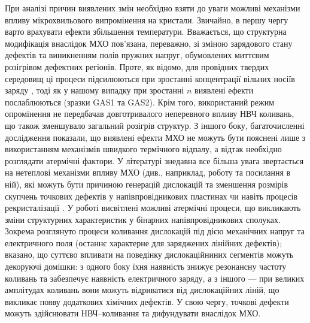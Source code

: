 При аналізі причин виявлених змін необхідно взяти до уваги можливі механізми впливу
мікрохвильового випромінення на кристали. 
Звичайно, в першу чергу варто врахувати ефекти збільшення температури.
Вважається, що  структурна модифікація внаслідок МХО пов'язана, переважно,
зі зміною зарядового стану дефектів та виникненням полів пружних напруг, обумовлених миттєвим розігрівом дефектних регіонів.
Проте, як відомо, для провідних твердих середовищ ці процеси підсилюються при зростанні концентрації вільних носіїв заряду \cite{MW:Rev}, тоді як у нашому випадку при зростанні $n$ виявлені ефекти послаблюються (зразки GAS1 та GAS2).
Крім того, використаний режим опромінення не передбачав довготривалого неперевного впливу НВЧ коливань, що також зменшувало загальний розігрів структур.
З іншого боку, багаточисленні дослідження показали, що виявлені ефекти МХО не можуть бути пояснені лише з використанням механізмів швидкого термічного відпалу, а відтак необхідно розглядати атермічні фактори.
У літературі знедавна все більша увага звертається на нетеплові механізми впливу МХО (див., наприклад, роботу \cite{MW:Si2018} та посилання в ній), які можуть бути причиною генерацій дислокацій та зменшення розмірів скупчень точкових дефектів у напівпровідникових пластинах \cite{Konakova2007JTF} чи навіть процесів рекристалізації \cite{MW:Si2018}.
У роботі \cite{Konakova2007JTF} висвітлені можливі атермічні процеси, що викликають зміни структурних характеристик у бінарних напівпровідникових сполуках.
Зокрема розглянуто процеси коливання дислокацій під дією механічних напруг та електричного поля (останнє характерне для заряджених лінійних дефектів);
вказано, що суттєво впливати на поведінку дислокаційниних сегментів можуть декоруючі домішки:
з одного боку їхня наявність знижує резонансну частоту коливань та забезпечує наявність електричного заряду,
а з іншого --- при великих амплітудах коливань вони можуть відриватися від дислокаційних ліній, що викликає появу додаткових хімічних дефектів.
У свою чергу, точкові дефекти можуть здійснювати НВЧ--коливання та дифундувати внаслідок МХО.



